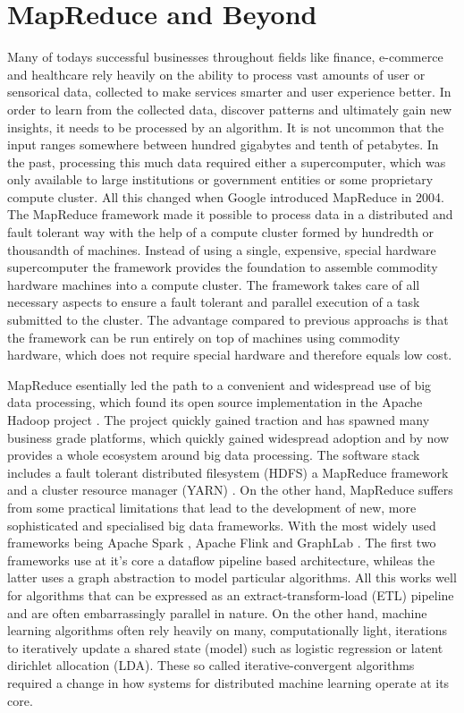 \section{MapReduce and Beyond}
Many of todays successful businesses throughout fields like finance, e-commerce and healthcare rely heavily on the ability to process vast amounts of user or sensorical data, collected to make services smarter and user experience better.
In order to learn from the collected data, discover patterns and ultimately gain new insights, it needs to be processed by an algorithm.
It is not uncommon that the input ranges somewhere between hundred gigabytes and tenth of petabytes.
In the past, processing this much data required either a supercomputer, which was only available to large institutions or government entities or some proprietary compute cluster.
All this changed when Google introduced MapReduce \cite{Dean2004} in 2004.
The MapReduce framework made it possible to process data in a distributed and fault tolerant way with the help of a compute cluster formed by hundredth or thousandth of machines.
Instead of using a single, expensive, special hardware supercomputer the framework provides the foundation to assemble commodity hardware machines into a compute cluster.
The framework takes care of all necessary aspects to ensure a fault tolerant and parallel execution of a task submitted to the cluster.
The advantage compared to previous approachs is that the framework can be run entirely on top of machines using commodity hardware, which does not require special hardware and therefore equals low cost.

MapReduce esentially led the path to a convenient and widespread use of big data processing, which found its open source implementation in the Apache Hadoop project \cite{hadoop2009hadoop}.
The project quickly gained traction and has spawned many business grade platforms, which quickly gained widespread adoption and by now provides a whole ecosystem around big data processing. The software stack includes a fault tolerant distributed filesystem (HDFS) a MapReduce framework and a cluster resource manager (YARN) \cite{KumarVavilapalli2013}.
On the other hand, MapReduce suffers from some practical limitations that lead to the development of new, more sophisticated and specialised big data frameworks. With the most widely used frameworks being Apache Spark \cite{Zaharia2010}, Apache Flink \cite{Alexandrov2014} and GraphLab \cite{Low2012}.
The first two frameworks use at it's core a dataflow pipeline based architecture, whileas the latter uses a graph abstraction to model particular algorithms.
All this works well for algorithms that can be expressed as an extract-transform-load (ETL) pipeline and are often embarrassingly parallel in nature.
On the other hand, machine learning algorithms often rely heavily on many, computationally light, iterations to iteratively update a shared state (model) such as logistic regression or latent dirichlet allocation (LDA).
These so called iterative-convergent algorithms required a change in how systems for distributed machine learning operate at its core.


